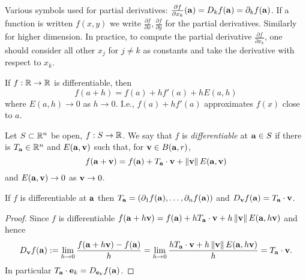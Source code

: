 Various symbols used for partial derivatives:
\(\frac{\partial f}{\partial x_k}(\aa) = D_kf(\aa) = \partial_{k}f(\aa)\).
If  a function is written \(f(x,y)\) we write \(\frac{\partial f}{\partial x}, \frac{\partial f}{\partial y}\) for the partial derivatives. Similarly for higher dimension.
In practice, to compute the partial derivative \( \frac{\partial f}{\partial x_k}\), one should consider all other \(x_j\) for \(j\neq k\) as constants and take the derivative with respect to \(x_k\).


If \(f:\bR \to \bR\) is differentiable, then
\[
    f(a + h) = f(a) + h f'(a) + hE(a,h)
\]
where \(E(a,h) \to 0\) as \(h\to 0\).
I.e., \(f(a) + hf'(a)\) approximates \(f(x)\) close to \(a\).


\begin{definition}[differentiable]
    Let \(S\subset \bR^n\) be open, \(f:S \to \bR\).
    We say that \(f\) is \emph{differentiable} at \(\aa \in S\) if there is \(T_\aa \in \bR^n\) and \(E(\aa,\vv)\) such that, for \(\vv\in B(\aa,r)\),
    \[
        f(\aa+\vv) = f(\aa) + T_\aa \cdot \vv + \norm{\vv}E(\aa,\vv)
    \]
    and \(E(\aa,\vv) \to 0\) as \(\vv \to 0\).
\end{definition}

\begin{theorem}
    If \(f\) is differentiable at \(\aa\)
    then \(T_\aa = \left( \partial_1 f(\aa), \ldots, \partial_nf(\aa) \right)\)
    and \(D_{\vv}f(\aa) = T_{\aa}\cdot \vv\).
\end{theorem}



\begin{proof}
    Since \(f\) is differentiable
    \(  f(\aa+ h \vv) = f(\aa) + h T_\aa \cdot \vv + h\norm{\vv}E(\aa,h\vv)\)
    and hence
    \[
        D_{\vv}f(\aa) :=
        \lim_{h\to 0} \frac{f(\aa+h \vv) - f(\aa)}{h}
        =
        \lim_{h\to 0} \frac{ h T_\aa \cdot \vv + h\norm{\vv}E(\aa,h\vv) }{h}
        = T_\aa \cdot \vv.
    \]
    In particular \(T_\aa\cdot \ee_k = D_{\ee_k}f(\aa)\).
\end{proof}





